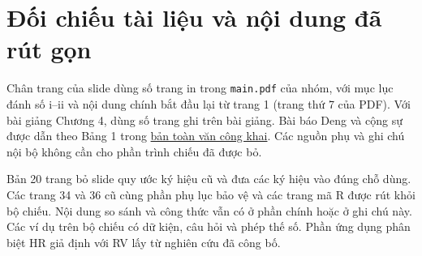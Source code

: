 \documentclass[11pt,a4paper]{article}
\begin{document}
\section{Đối chiếu tài liệu và nội dung đã rút gọn}
Chân trang của slide dùng số trang in trong \texttt{main.pdf} của nhóm,
với mục lục đánh số i--ii và nội dung chính bắt đầu lại từ trang 1 (trang thứ 7 của PDF). Với bài giảng Chương 4, dùng số
trang ghi trên bài giảng. Bài báo Deng và cộng sự được dẫn theo Bảng 1
trong \href{https://link.springer.com/article/10.1186/1477-7525-11-89}{bản toàn văn công khai}.
Các nguồn phụ và ghi chú nội bộ không cần cho phần trình chiếu đã được bỏ.

Bản 20 trang bỏ slide quy ước ký hiệu cũ và đưa các ký hiệu vào đúng chỗ dùng.
Các trang 34 và 36 cũ cùng phần phụ lục bảo vệ và các trang mã R được rút khỏi
bộ chiếu. Nội dung so sánh và công thức vẫn có ở phần chính hoặc ở ghi chú này.
Các ví dụ trên bộ chiếu có dữ kiện, câu hỏi và phép thế số. Phần ứng dụng
phân biệt HR giả định với RV lấy từ nghiên cứu đã công bố.
\end{document}

